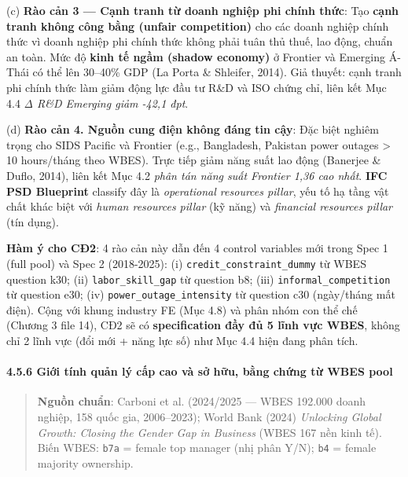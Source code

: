 \documentclass[12pt,a4paper]{article}
\begin{document}
(c) \textbf{Rào cản 3 --- Cạnh tranh từ doanh nghiệp phi chính thức}:
Tạo \textbf{cạnh tranh không công bằng (unfair competition)} cho các
doanh nghiệp chính thức vì doanh nghiệp phi chính thức không phải tuân
thủ thuế, lao động, chuẩn an toàn. Mức độ \textbf{kinh tế ngầm (shadow
economy)} ở Frontier và Emerging Á-Thái có thể lên 30--40\% GDP (La
Porta \& Shleifer, 2014). Giả thuyết: cạnh tranh phi chính thức làm giảm
động lực đầu tư R\&D và ISO chứng chỉ, liên kết Mục 4.4 \emph{Δ R\&D
Emerging giảm -42,1 đpt}.

(d) \textbf{Rào cản 4. Nguồn cung điện không đáng tin cậy}: Đặc biệt
nghiêm trọng cho SIDS Pacific và Frontier (e.g., Bangladesh, Pakistan
power outages \textgreater{} 10 hours/tháng theo WBES). Trực tiếp giảm
năng suất lao động (Banerjee \& Duflo, 2014), liên kết Mục 4.2
\emph{phân tán năng suất Frontier 1,36 cao nhất}. \textbf{IFC PSD
Blueprint} classify đây là \emph{operational resources pillar}, yếu tố
hạ tầng vật chất khác biệt với \emph{human resources pillar} (kỹ năng)
và \emph{financial resources pillar} (tín dụng).

\textbf{Hàm ý cho CĐ2}: 4 rào cản này dẫn đến 4 control variables mới
trong Spec 1 (full pool) và Spec 2 (2018-2025): (i)
\texttt{credit\_constraint\_dummy} từ WBES question k30; (ii)
\texttt{labor\_skill\_gap} từ question b8; (iii)
\texttt{informal\_competition} từ question e30; (iv)
\texttt{power\_outage\_intensity} từ question c30 (ngày/tháng mất điện).
Cộng với khung industry FE (Mục 4.8) và phân nhóm con thể chế (Chương 3
file 14), CĐ2 sẽ có \textbf{specification đầy đủ 5 lĩnh vực WBES}, không
chỉ 2 lĩnh vực (đổi mới + năng lực số) như Mục 4.4 hiện đang phân tích.

\hypertarget{456-giux1edbi-tuxednh-quux1ea3n-luxfd-cux1ea5p-cao-vuxe0-sux1edf-hux1eefu-bux1eb1ng-chux1ee9ng-tux1eeb-wbes-pool}{%
\paragraph{4.5.6 Giới tính quản lý cấp cao và sở hữu, bằng chứng từ WBES
pool}\label{456-giux1edbi-tuxednh-quux1ea3n-luxfd-cux1ea5p-cao-vuxe0-sux1edf-hux1eefu-bux1eb1ng-chux1ee9ng-tux1eeb-wbes-pool}}

\begin{quote}
\textbf{Nguồn chuẩn}: Carboni et al. (2024/2025 --- WBES 192.000 doanh
nghiệp, 158 quốc gia, 2006--2023); World Bank (2024) \emph{Unlocking
Global Growth: Closing the Gender Gap in Business} (WBES 167 nền kinh
tế). Biến WBES: \texttt{b7a} = female top manager (nhị phân Y/N);
\texttt{b4} = female majority ownership.
\end{quote}
\end{document}
